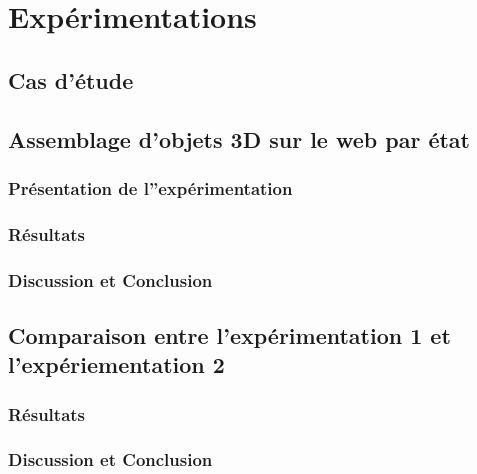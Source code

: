 \chapter{Expérimentations}
\chaptertable
\section{Cas d'étude}
\section{Assemblage d'objets 3D sur le web par état}
\subsection{Présentation de l''expérimentation}
\subsection{Résultats}
\subsection{Discussion et Conclusion}







\section{Comparaison entre l'expérimentation 1 et l'expériementation 2}
\subsection{Résultats}
\subsection{Discussion et Conclusion}
